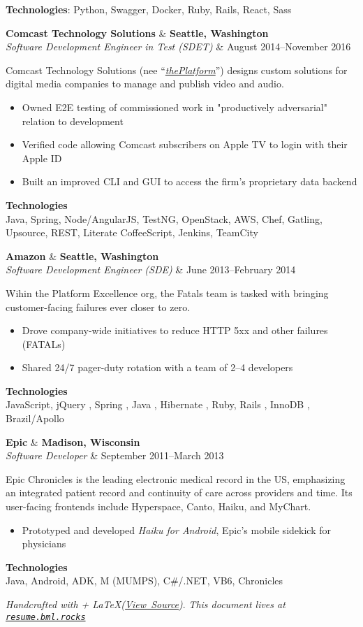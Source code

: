 \documentclass[line,margin]{res}
\newcommand{\role}[4]{
  \begin{tabularx}
    \textbf{#1}   & \hfill \textbf{#2} \\
    \textit{#3}   & \hfill #4          \\
  \end{tabularx}
}
\newcommand{\employerSummary}[1]{
  \begin{small} 
    #1 
  \end{small}
}
\newcommand{\impact}[1]{
    \begin{itemize}
        #1
    \end{itemize}
}
\newcommand{\technologies}[1]{
    \textbf{Technologies}: #1
}
\begin{document}
\begin{resume}
    \technologies{
      Python, Swagger, Docker, Ruby, Rails, React, Sass
    }

    \role
      {Comcast Technology Solutions}
      {Seattle, Washington}
      {Software Development Engineer in Test (SDET)}
      {August 2014--November 2016}
    \employerSummary
    {
      Comcast Technology Solutions 
      (nee ``\href{https://en.wikipedia.org/wiki/ThePlatform}{\textit{thePlatform}}'')
      designs custom solutions for digital media companies to manage and publish video and audio.
    }
    \impact{
        \item Owned E2E testing of commissioned work in "productively adversarial" relation to development
        \item Verified code allowing Comcast subscribers on Apple TV to login with their Apple ID
        \item Built an improved CLI and GUI to access the firm's proprietary data backend
    }

    \textbf{Technologies} \\
    Java, Spring, Node/AngularJS, TestNG, OpenStack, AWS, Chef, Gatling, Upsource, REST, Literate CoffeeScript, Jenkins, TeamCity


    \role
      {Amazon}
      {Seattle, Washington}
      {Software Development Engineer (SDE)}
      {June 2013--February 2014}
    \employerSummary
      {Wihin the Platform Excellence org, the Fatals team is tasked 
       with bringing customer-facing failures ever closer to zero.}
    \impact{
        \item Drove company-wide initiatives to reduce HTTP 5xx and other failures (FATALs)
        \item Shared 24/7 pager-duty rotation with a team of 2--4 developers
    }

    \textbf{Technologies} \\
    JavaScript, jQuery , Spring , Java , Hibernate , Ruby, Rails , InnoDB , Brazil/Apollo

    \role
      {Epic}
      {Madison, Wisconsin}
      {Software Developer}
      {September 2011--March 2013}
    \employerSummary
      {Epic Chronicles is the leading electronic medical record in the US, emphasizing an integrated patient record and continuity of care across providers and time. Its user-facing frontends include Hyperspace, Canto, Haiku, and MyChart.}
    \impact{
        \item Prototyped and developed \textit{Haiku for Android}, Epic's mobile sidekick for physicians
    }
    \textbf{Technologies} \\
    Java, Android, ADK, M (MUMPS), C#/.NET, VB6, Chronicles


\end{resume}

\vfill
\textit{Handcrafted with \heartsuit + \LaTeX (\href{https://github.com/Cheezmeister/resume/raw/master/b_luchen_resume.tex}{View\ Source})}.
\hfill
\textit{This document lives at \texttt{\href{http://resume.bml.rocks}{resume.bml.rocks}}}
\\
\end{document}
